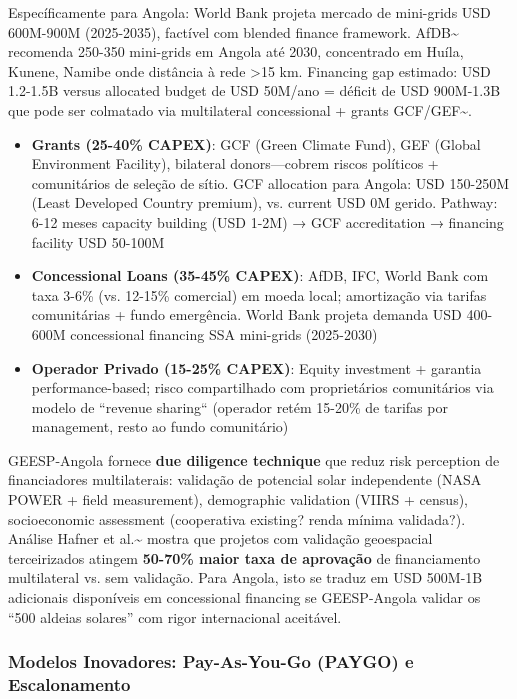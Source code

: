 \documentclass[12pt, a4paper]{article}
\begin{document}
Específicamente para Angola: World Bank projeta mercado de mini-grids USD 600M-900M (2025-2035), factível com blended finance framework. AfDB\textasciitilde{}\citep{AfDB2024AngolaAssessment} recomenda 250-350 mini-grids em Angola até 2030, concentrado em Huíla, Kunene, Namibe onde distância à rede >15 km. Financing gap estimado: USD 1.2-1.5B versus allocated budget de USD 50M/ano = déficit de USD 900M-1.3B que pode ser colmatado via multilateral concessional + grants GCF/GEF\textasciitilde{}\citep{GCFMiniGridFramework2024}.

\begin{itemize}
\item \textbf{Grants (25-40\% CAPEX)}: GCF (Green Climate Fund), GEF (Global Environment Facility), bilateral donors—cobrem riscos políticos + comunitários de seleção de sítio. GCF allocation para Angola: USD 150-250M (Least Developed Country premium), vs. current USD 0M gerido. Pathway: 6-12 meses capacity building (USD 1-2M) → GCF accreditation → financing facility USD 50-100M
\item \textbf{Concessional Loans (35-45\% CAPEX)}: AfDB, IFC, World Bank com taxa 3-6\% (vs. 12-15\% comercial) em moeda local; amortização via tarifas comunitárias + fundo emergência. World Bank projeta demanda USD 400-600M concessional financing SSA mini-grids (2025-2030)
\item \textbf{Operador Privado (15-25\% CAPEX)}: Equity investment + garantia performance-based; risco compartilhado com proprietários comunitários via modelo de ``revenue sharing`` (operador retém 15-20\% de tarifas por management, resto ao fundo comunitário)

\end{itemize}

GEESP-Angola fornece 
\textbf{due diligence technique} que reduz risk perception de financiadores multilaterais: validação de potencial solar independente (NASA POWER + field measurement), demographic validation (VIIRS + census), socioeconomic assessment (cooperativa existing? renda mínima validada?). Análise Hafner et al.\textasciitilde{}\citep{Hafner2020} mostra que projetos com validação geoespacial terceirizados atingem 
\textbf{50-70\% maior taxa de aprovação} de financiamento multilateral vs. sem validação. Para Angola, isto se traduz em USD 500M-1B adicionais disponíveis em concessional financing se GEESP-Angola validar os ``500 aldeias solares'' com rigor internacional aceitável.

\subsubsection{Modelos Inovadores: Pay-As-You-Go (PAYGO) e Escalonamento}
\end{document}
